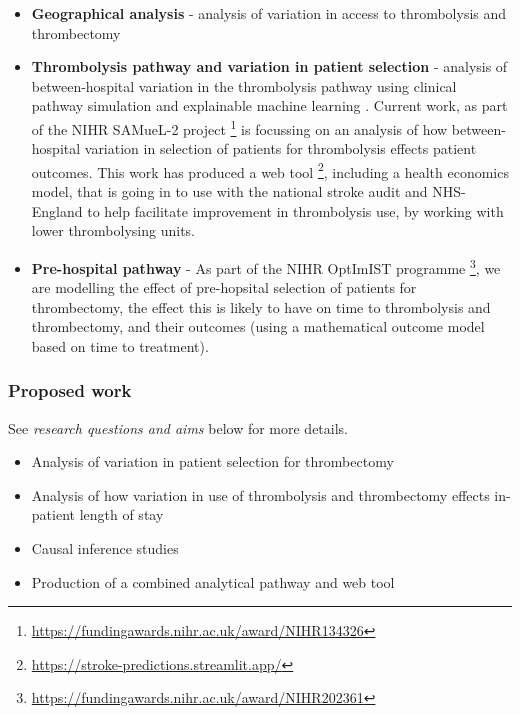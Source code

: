 \begin{itemize}
    \item \textbf{Geographical analysis} - analysis of variation in access to thrombolysis and thrombectomy \cite{allen_maximising_2019}

    \item \textbf{Thrombolysis pathway and variation in patient selection} - analysis of between-hospital variation in the thrombolysis pathway using clinical pathway simulation and explainable machine learning \cite{allen_use_2022, pearn_what_2023}. Current work, as part of the NIHR SAMueL-2 project \footnote{\url{https://fundingawards.nihr.ac.uk/award/NIHR134326}} is focussing on an analysis of how between-hospital variation in selection of patients for thrombolysis effects patient outcomes. This work has produced a web tool \footnote{\url{https://stroke-predictions.streamlit.app/}}, including a health economics model, that is going in to use with the national stroke audit and NHS-England to help facilitate improvement in thrombolysis use, by working with lower thrombolysing units.

    \item \textbf{Pre-hospital pathway} - As part of the NIHR OptImIST programme \footnote{\url{https://fundingawards.nihr.ac.uk/award/NIHR202361}}, we are modelling the effect of pre-hopsital selection of patients for thrombectomy, the effect this is likely to have on time to thrombolysis and thrombectomy, and their outcomes (using a mathematical outcome model based on time to treatment).
    
\end{itemize}

\subsubsection{Proposed work}

See \textit{research questions and aims} below for more details. 

\begin{itemize}
    \item Analysis of variation in patient selection for thrombectomy

    \item Analysis of how variation in use of thrombolysis and thrombectomy effects in-patient length of stay

    \item Causal inference studies

    \item Production of a combined analytical pathway and web tool
    
\end{itemize}

